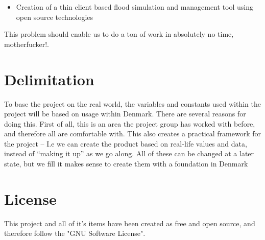 \begin{itemize}
\item Creation of a thin client based flood simulation and management tool using open source technologies
\end{itemize}

\noindent This problem should enable us to do a ton of work in absolutely no time, motherfucker!.

\section{Delimitation}
To base the project on the real world, the variables and constants used within the project will be based on usage within Denmark.   
There are several reasons for doing this. First of all, this is an area the project group has worked with before, and therefore all are comfortable with. This also creates a practical framework for the project – I.e we can create the product based on real-life values and data, instead of “making it up” as we go along. 
All of these can be changed at a later state, but we fill it makes sense to create them with a foundation in Denmark


\section{License}

This project and all of it's items have been created as free and open source, and therefore follow the "GNU Software License".